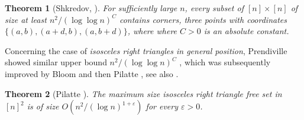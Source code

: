 \documentclass[11pt]{article}
\theoremstyle{plain}
\newtheorem{theorem}{\bf Theorem}[section]
\begin{document}
	\begin{theorem}[Shkredov, \cite{Sh}]
		For sufficiently large $n$, every subset of $[n] \times [n]$ of size
		at least $n^2/(\log \log n)^C$
		contains corners, three points with coordinates
		$\{(a, b),(a + d, b),(a, b + d)\}$, where where $C> 0$ is an absolute constant. 
	\end{theorem}
	
	Concerning the case of  \textit{isosceles right triangles in general position}, Prendiville showed similar upper bound $n^2/(\log \log n)^C$ \cite{Pren}, which was subsequently improved by Bloom \cite{Bloom} and then Pilatte \cite{Pilatte}, see also \cite{SS}.
	
	\begin{theorem}[Pilatte \cite{Pilatte}] The maximum size isosceles right triangle free set in $[n]^2$ is of size  $O(n^2/(\log n)^{1+\varepsilon})$ for every $\varepsilon>0$.
	\end{theorem}
	
\end{document}
